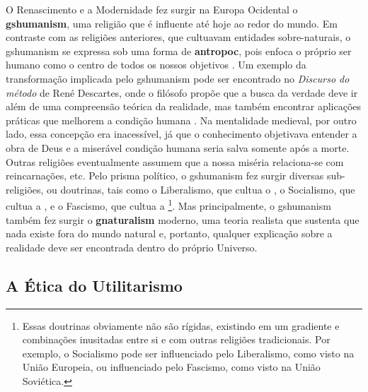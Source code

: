 \documentclass[./main.tex]{subfiles}
\begin{document}
\par O Renascimento e a Modernidade fez surgir na Europa Ocidental o \textbf{\gls{gshumanism}}, uma religião que é influente até hoje ao redor do mundo. Em contraste com as religiões anteriores, que cultuavam entidades sobre-naturais, o \gls{gshumanism} se expressa sob uma forma de \textbf{\gls{antropoc}}, pois enfoca o próprio ser humano como o centro de todos os nossos objetivos \cite{lamont1997philosophy}. Um exemplo da transformação implicada pelo \gls{gshumanism} pode ser encontrado no \textit{Discurso do método} de René Descartes, onde o filósofo propõe que a busca da verdade deve ir além de uma compreensão teórica da realidade, mas também encontrar aplicações práticas que melhorem a condição humana \cite{descartes2008discurso}. Na mentalidade medieval, por outro lado, essa concepção era inacessível, já que o conhecimento objetivava entender a obra de Deus e a miserável condição humana seria salva somente após a morte. Outras religiões eventualmente assumem que a nossa miséria relaciona-se com reincarnações, etc. Pelo prisma político, o \gls{gshumanism} fez surgir diversas sub-religiões, ou doutrinas, tais como o Liberalismo, que cultua o , o Socialismo, que cultua a , e o Fascismo, que cultua a \footnote{Essas doutrinas obviamente não são rígidas, existindo em um gradiente e combinações inusitadas entre si e com outras religiões tradicionais. Por exemplo, o Socialismo pode ser influenciado pelo Liberalismo, como visto na União Europeia, ou influenciado pelo Fascismo, como visto na União Soviética.}. Mas principalmente, o \gls{gshumanism} também fez surgir o \textbf{\gls{gnaturalism}} moderno, uma \gls{teoria} realista que sustenta que nada existe fora do mundo natural e, portanto, qualquer explicação sobre a realidade deve ser encontrada dentro do próprio Universo.

\subsection{A Ética do Utilitarismo} \label{subsec:bentham}
\end{document}
